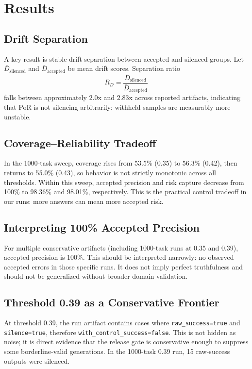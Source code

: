 \documentclass[11pt]{article}
\begin{document}
\section{Results}
\subsection{Drift Separation}
A key result is stable drift separation between accepted and silenced groups. Let $\bar{D}_{\text{silenced}}$ and $\bar{D}_{\text{accepted}}$ be mean drift scores. Separation ratio
\begin{equation}
R_D = \frac{\bar{D}_{\text{silenced}}}{\bar{D}_{\text{accepted}}}
\end{equation}
falls between approximately 2.0x and 2.83x across reported artifacts, indicating that PoR is not silencing arbitrarily: withheld samples are measurably more unstable.

\subsection{Coverage--Reliability Tradeoff}
In the 1000-task sweep, coverage rises from 53.5\% (0.35) to 56.3\% (0.42), then returns to 55.0\% (0.43), so behavior is not strictly monotonic across all thresholds. Within this sweep, accepted precision and risk capture decrease from 100\% to 98.36\% and 98.01\%, respectively. This is the practical control tradeoff in our runs: more answers can mean more accepted risk.

\subsection{Interpreting 100\% Accepted Precision}
For multiple conservative artifacts (including 1000-task runs at 0.35 and 0.39), accepted precision is 100\%. This should be interpreted narrowly: no observed accepted errors in those specific runs. It does not imply perfect truthfulness and should not be generalized without broader-domain validation.

\subsection{Threshold 0.39 as a Conservative Frontier}
At threshold 0.39, the run artifact contains cases where \texttt{raw\_success=true} and \texttt{silence=true}, therefore \texttt{with\_control\_success=false}. This is not hidden as noise; it is direct evidence that the release gate is conservative enough to suppress some borderline-valid generations. In the 1000-task 0.39 run, 15 raw-success outputs were silenced.
\end{document}
